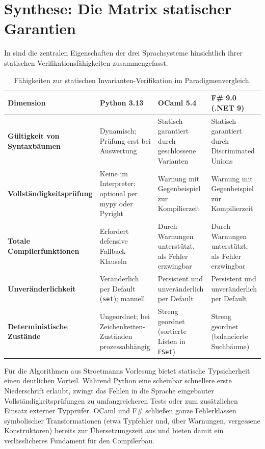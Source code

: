 \section{Synthese: Die Matrix statischer Garantien}
\label{sec:soundness_synthesis}

In  sind die zentralen Eigenschaften der drei Sprachsysteme hinsichtlich ihrer statischen Verifikationsfähigkeiten zusammengefasst.

\begin{table}[htbp]
  \centering
  \small
  \caption{Fähigkeiten zur statischen Invarianten-Verifikation im Paradigmenvergleich.}
  \label{tab:soundness_matrix}
  \begin{tabularx}{\textwidth}{lXXX}
    \toprule
    \textbf{Dimension} & \textbf{Python 3.13} & \textbf{OCaml 5.4} & \textbf{F\# 9.0 (.NET 9)} \\
    \midrule
    \textbf{Gültigkeit von Syntaxbäumen} & Dynamisch; Prüfung erst bei Auswertung & Statisch garantiert durch geschlossene Varianten & Statisch garantiert durch Discriminated Unions \\
    \addlinespace[3pt]
    \textbf{Vollständigkeitsprüfung} & Keine im Interpreter; optional per mypy oder Pyright & Warnung mit Gegenbeispiel zur Kompilierzeit & Warnung mit Gegenbeispiel zur Kompilierzeit \\
    \addlinespace[3pt]
    \textbf{Totale Compilerfunktionen} & Erfordert defensive Fallback-Klauseln & Durch Warnungen unterstützt, als Fehler erzwingbar & Durch Warnungen unterstützt, als Fehler erzwingbar \\
    \addlinespace[3pt]
    \textbf{Unveränderlichkeit} & Veränderlich per Default (\texttt{set}); manuell & Persistent und unveränderlich per Default & Persistent und unveränderlich per Default \\
    \addlinespace[3pt]
    \textbf{Deterministische Zustände} & Ungeordnet; bei Zeichenketten-Zuständen prozessabhängig & Streng geordnet (sortierte Listen in \texttt{FSet}) & Streng geordnet (balancierte Suchbäume) \\
    \bottomrule
  \end{tabularx}
\end{table}

\begin{finding}
Für die Algorithmen aus Stroetmanns Vorlesung bietet statische Typsicherheit einen deutlichen Vorteil.
Während Python eine scheinbar schnellere erste Niederschrift erlaubt, zwingt das Fehlen in die Sprache eingebauter Vollständigkeitsprüfungen zu umfangreicheren Tests oder zum zusätzlichen Einsatz externer Typprüfer.
OCaml und F\# schließen ganze Fehlerklassen symbolischer Transformationen (etwa Typfehler und, über Warnungen, vergessene Konstruktoren) bereits zur Übersetzungszeit aus und bieten damit ein verlässlicheres Fundament für den Compilerbau.
\end{finding}
